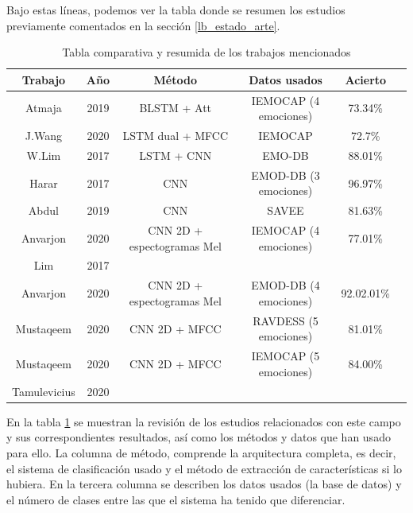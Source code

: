 \documentclass[11pt,a4paper,spanish]{book}
\begin{document}

	Bajo estas líneas, podemos ver la tabla donde se resumen los estudios previamente comentados en la sección \ref{lb_estado_arte}.\\
	\begin{table}[h]
		\begin{center}
			\begin{tabular}{| c | c | c | c| c | c|}
				\hline
					Trabajo & Año & Método &  Datos usados  & Acierto \\ 
				\hline
					Atmaja & 2019 &   BLSTM + Att  & IEMOCAP (4 emociones) & 73.34\% 	\\
					J.Wang & 2020 & LSTM dual + MFCC & IEMOCAP & 72.7\% \\
					W.Lim & 2017 &   LSTM + CNN & EMO-DB &  88.01\%		\\ 
					Harar & 2017 &  CNN & EMOD-DB (3 emociones) &  96.97\%			\\
					Abdul & 2019 & CNN & SAVEE & 81.63\%				\\
					Anvarjon & 2020 & CNN 2D + espectogramas Mel & IEMOCAP (4 emociones) & 77.01\%\\
					Lim & 2017 & & & \\
					Anvarjon & 2020 & CNN 2D + espectogramas Mel & EMOD-DB (4 emociones) & 92.02.01\%\\
					Mustaqeem & 2020 & CNN 2D + MFCC & RAVDESS (5 emociones) & 81.01\% \\
					Mustaqeem & 2020 & CNN 2D + MFCC & IEMOCAP (5 emociones) & 84.00\% \\  
					Tamulevicius & 2020 & & &\\
				\hline	
			\end{tabular}
		
			\caption{Tabla comparativa y resumida de los trabajos mencionados}
			\label{tab:metod_comp}
		\end{center}
	\end{table}

	En la tabla \ref{tab:metod_comp} se muestran la revisión de los estudios relacionados con este campo y sus correspondientes resultados, así como los métodos y datos que han usado para ello. La columna de método, comprende la arquitectura completa, es decir, el sistema de clasificación usado y el método de extracción de características si lo hubiera. En la tercera columna se describen los datos usados (la base de datos) y el número de clases entre las que el sistema ha tenido que diferenciar.
	
\end{document}
